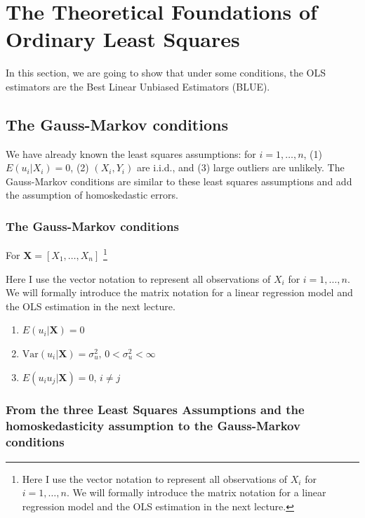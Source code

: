 \documentclass[a4paper,11pt]{article}
\newcommand{\var}{\mathrm{Var}}
\begin{document}
\section{The Theoretical Foundations of Ordinary Least Squares}
\label{sec:orgfece461}

In this section, we are going to show that under some conditions, the
OLS estimators are the Best Linear Unbiased Estimators (BLUE). 

\subsection{The Gauss-Markov conditions}
\label{sec:org41a2d1b}

We have already known the least squares assumptions: for \(i = 1,
\ldots, n\), (1) \(E(u_i|X_i) = 0\), (2) \((X_i, Y_i)\) are i.i.d., and (3)
large outliers are unlikely. The Gauss-Markov conditions are similar
to these least squares assumptions and add the assumption of
homoskedastic errors.

\subsubsection*{The Gauss-Markov conditions}
\label{sec:org87a8675}
For \(\mathbf{X} = [X_1, \ldots, X_n]\) \footnote{Here I use the vector
notation to represent all observations of \(X_i\) for \(i=1, \ldots,
n\). We will formally introduce the matrix notation for a linear
regression model and the OLS estimation in the next lecture.}

Here I use the vector
notation to represent all observations of \(X_i\) for \(i=1, \ldots,
n\). We will formally introduce the matrix notation for a linear
regression model and the OLS estimation in the next lecture.

\begin{enumerate}
\item \(E(u_i| \mathbf{X}) = 0\)
\item \(\var(u_i | \mathbf{X}) = \sigma^2_u,\, 0 < \sigma^2_u < \infty\)
\item \(E(u_i u_j | \mathbf{X}) = 0,\, i \neq j\)
\end{enumerate}

\subsubsection*{From the three Least Squares Assumptions and the homoskedasticity assumption to the Gauss-Markov conditions}
\label{sec:org96634e0}
\end{document}
